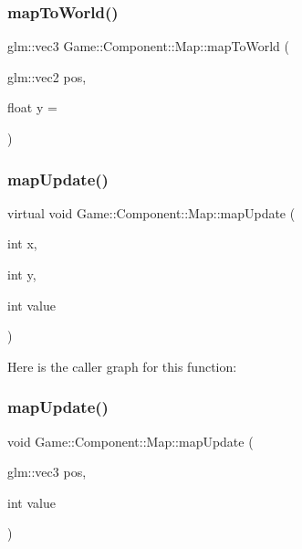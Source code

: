 \subsubsection{\texorpdfstring{map\+To\+World()}{mapToWorld()}}
{\footnotesize\ttfamily glm\+::vec3 Game\+::\+Component\+::\+Map\+::map\+To\+World (\begin{DoxyParamCaption}\item[{glm\+::vec2}]{pos,  }\item[{float}]{y = {} }\end{DoxyParamCaption})}

\mbox{\label{class_game_1_1_component_1_1_map_ae1900809e3369230a8dd3678a397ba98}} 
\subsubsection{\texorpdfstring{map\+Update()}{mapUpdate()}\hspace{0.1cm}{\footnotesize\ttfamily [1/2]}}
{\footnotesize\ttfamily virtual void Game\+::\+Component\+::\+Map\+::map\+Update (\begin{DoxyParamCaption}\item[{int}]{x,  }\item[{int}]{y,  }\item[{int}]{value }\end{DoxyParamCaption})\hspace{0.3cm}{\ttfamily [virtual]}}

Here is the caller graph for this function\+:
\mbox{\label{class_game_1_1_component_1_1_map_aa62669035c53c17e1a7b680d28514575}} 
\subsubsection{\texorpdfstring{map\+Update()}{mapUpdate()}\hspace{0.1cm}{\footnotesize\ttfamily [2/2]}}
{\footnotesize\ttfamily void Game\+::\+Component\+::\+Map\+::map\+Update (\begin{DoxyParamCaption}\item[{glm\+::vec3}]{pos,  }\item[{int}]{value }\end{DoxyParamCaption})}

